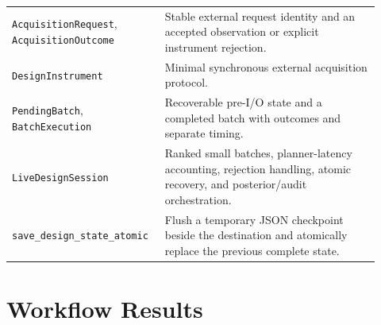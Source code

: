 \documentclass[11pt,oneside]{report}
\newcommand{\code}[1]{\texttt{#1}}
\begin{document}
\begin{longtable}{p{0.35\linewidth}p{0.57\linewidth}}
\code{AcquisitionRequest}, \code{AcquisitionOutcome} & Stable external request
identity and an accepted observation or explicit instrument rejection. \\
\code{DesignInstrument} & Minimal synchronous external acquisition protocol. \\
\code{PendingBatch}, \code{BatchExecution} & Recoverable pre-I/O state and a
completed batch with outcomes and separate timing. \\
\code{LiveDesignSession} & Ranked small batches, planner-latency accounting,
rejection handling, atomic recovery, and posterior/audit orchestration. \\
\code{save\_design\_state\_atomic} & Flush a temporary JSON checkpoint beside
the destination and atomically replace the previous complete state. \\
\bottomrule
\end{longtable}

\section{Workflow Results}
\end{document}
